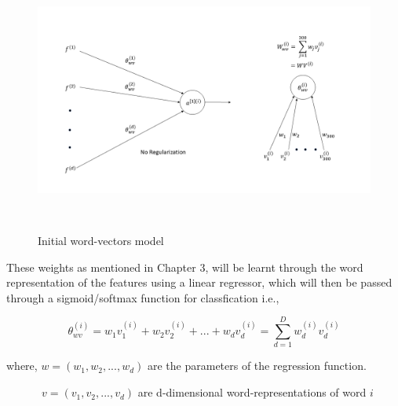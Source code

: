 \begin{figure}[htbp]
\centering
\includegraphics[width=16cm, height=8cm]{images/init-wv.png}\\
\centering
\caption{Initial word-vectors model}
\label{fig:foo}
\end{figure}


These weights as mentioned in Chapter 3, will be learnt through the word representation of the features using a linear regressor, which will then be passed through a sigmoid/softmax function for classfication i.e.,

\begin{equation}
\theta_{wv}^{(i)} = w_{1}v_{1}^{(i)} + w_{2}v_{2}^{(i)} + ... + w_{d}v_{d}^{(i)} = \sum_{d=1}^{D} w_{d}^{(i)}v_{d}^{(i)}
\end{equation}

where, $w = (w_{1}, w_{2}, ..., w_{d})$ are the parameters of the regression function. 

$\quad\qquad\  v= (v_{1}, v_{2}, ..., v_{d})$ are d-dimensional word-representations of word $i$\\



